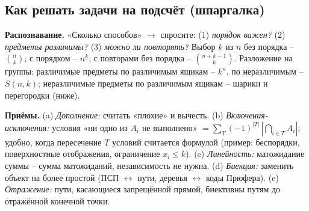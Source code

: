 \subsection{Как решать задачи на подсчёт (шпаргалка)}
\textbf{Распознавание.} «Сколько способов» $\to$ спросите: (1) \emph{порядок важен?} (2) \emph{предметы различимы?} (3) \emph{можно ли повторять?} Выбор $k$ из $n$ без порядка -- $\binom nk$; с порядком -- $n^{\underline k}$; с повторами без порядка -- $\binom{n+k-1}k$. Разложение на группы: различимые предметы по различимым ящикам -- $k^n$, по неразличимым -- $S(n,k)$; неразличимые предметы по различимым ящикам -- шарики и перегородки (ниже).
\par \textbf{Приёмы.} (a) \emph{Дополнение:} считать «плохие» и вычесть. (b) \emph{Включения-исключения:} условия «ни одно из $A_i$ не выполнено» $=\sum_{T}(-1)^{|T|}\,|\bigcap_{i\in T}A_i|$; удобно, когда пересечение $T$ условий считается формулой (пример: беспорядки, поверхностные отображения, ограничение $x_i\le k$). (c) \emph{Линейность:} матожидание суммы -- сумма матожиданий, независимость не нужна. (d) \emph{Биекция:} заменить объект на более простой (ПСП $\leftrightarrow$ пути, деревья $\leftrightarrow$ коды Прюфера). (e) \emph{Отражение:} пути, касающиеся запрещённой прямой, биективны путям до отражённой конечной точки.
